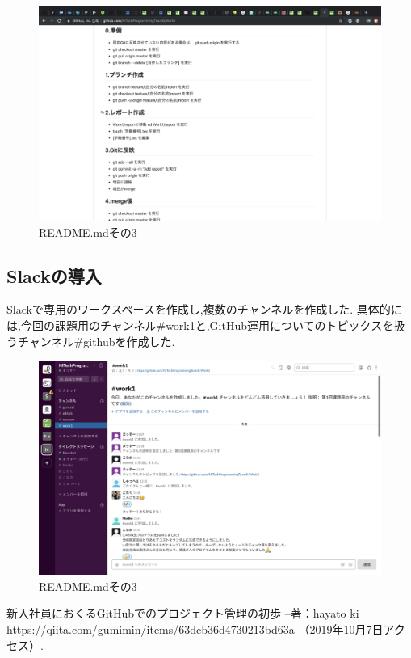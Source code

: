 \documentclass[uplatex,12pt]{jsarticle}
\begin{document}
\newpage

\begin{figure}[!hbt]
  \centering
  \includegraphics[scale=0.20]{git_image/read_me_3.png}
  \caption{README.mdその3}
\end{figure}

\subsection{Slackの導入}
Slackで専用のワークスペースを作成し,複数のチャンネルを作成した.
具体的には,今回の課題用のチャンネル\#work1と,GitHub運用についてのトピックスを扱うチャンネル\#githubを作成した.

\begin{figure}[!hbt]
  \centering
  \includegraphics[scale=0.20]{git_image/slack_image.png}
  \caption{README.mdその3}
\end{figure}

\begin{thebibliography}{99}
 新入社員におくるGitHubでのプロジェクト管理の初歩 --著：hayato ki \\
\url{https://qiita.com/gumimin/items/63dcb36d4730213bd63a} （2019年10月7日アクセス）.

\end{thebibliography}
\end{document}
